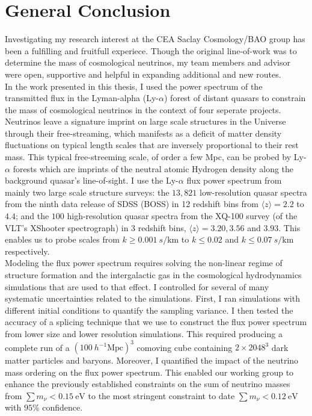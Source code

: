 \chapter*{General Conclusion}
{\color{purple}\titlerule[2.5pt]}
\vspace{4pc}%

\begin{intro}
{\color{purple}I}nvestigating my research interest at the CEA Saclay Cosmology/BAO group has been a fulfilling and fruitfull experiece. Though the original line-of-work was to determine the mass of cosmological neutrinos, my team members and advisor were open, supportive and helpful in expanding additional and new routes. \\

In the work presented in this thesis, I used the power spectrum of the transmitted flux in the Lyman-alpha (Ly-$\alpha$) forest of distant quasars to constrain the mass of cosmological neutrinos in the context of four seperate projects. Neutrinos leave a signature imprint on large scale structures in the Universe through their free-streaming, which manifests as a deficit of matter density fluctuations on typical length scales that are inversely proportional to their rest mass. This typical free-streeming scale, of order a few Mpc, can be probed by Ly-$\alpha$ forests which are imprints of the neutral atomic Hydrogen density along the background quasar's line-of-sight. I use the Ly-$\alpha$ flux power spectrum from mainly two large scale structure surveys: the $13,821$ low-resolution quasar spectra from the ninth data release of SDSS (BOSS) in 12 redshift bins from $\langle z \rangle = 2.2$ to $4.4$; and the $100$ high-resolution quasar spectra from the XQ-100 survey (of the VLT's XShooter spectrograph) in 3 redshift bins, $\langle z \rangle = 3.20, 3.56$ and $3.93$. This enables us to probe scales from $k \geq 0.001~s/\mathrm{km}$ to $k \leq 0.02$ and $k \leq 0.07~ s/\mathrm{km}$ respectively. \\

Modeling the flux power spectrum requires solving the non-linear regime of structure formation and the intergalactic gas in the cosmological hydrodynamics simulations that are used to that effect. I controlled for several of many systematic uncertainties related to the simulations. First, I ran simulations with different initial conditions to quantify the sampling variance. I then tested the accuracy of a splicing technique that we use to construct the flux power spectrum from lower size and lower resolution simulations. This required producing a complete run of a $(100~h^{-1}\mathrm{Mpc})^3$ comoving cube containing $2 \times 2048^3$ dark matter particles and baryons. Moreover, I quantified the impact of the neutrino mass ordering on the flux power spectrum. This enabled our working group to enhance the previously established constraints on the sum of neutrino masses from $\sum m_\nu < 0.15~\mathrm{eV}$ to the most stringent constraint to date $\sum m_\nu < 0.12~\mathrm{eV}$ with $95\%$ confidence. \\


\end{intro}
